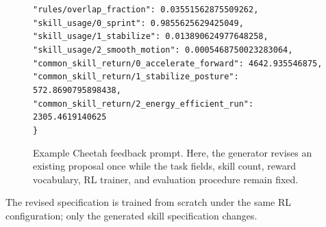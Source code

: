 \documentclass[conference,letterpaper,10pt]{IEEEtran}
\begin{document}
\begin{figure}[!t]
{\begin{minipage}{0.94\textwidth}
\texttt{\hspace*{1em}"rules/overlap\_fraction": 0.03551562875509262,}\\
\texttt{\hspace*{1em}"skill\_usage/0\_sprint": 0.9855625629425049,}\\
\texttt{\hspace*{1em}"skill\_usage/1\_stabilize": 0.013890624977648258,}\\
\texttt{\hspace*{1em}"skill\_usage/2\_smooth\_motion": 0.0005468750023283064,}\\
\texttt{\hspace*{1em}"common\_skill\_return/0\_accelerate\_forward": 4642.935546875,}\\
\texttt{\hspace*{1em}"common\_skill\_return/1\_stabilize\_posture": 572.8690795898438,}\\
\texttt{\hspace*{1em}"common\_skill\_return/2\_energy\_efficient\_run": 2305.4619140625}\\
\texttt{\}}
\end{minipage}
}

\caption{Example Cheetah feedback prompt. Here, the generator revises an existing proposal once while the task fields, skill count, reward vocabulary, RL trainer, and evaluation procedure remain fixed.}
\label{fig:llmfeedback}
\end{figure}

The revised specification is trained from scratch under the same RL configuration; only the generated skill specification changes.
\end{document}
